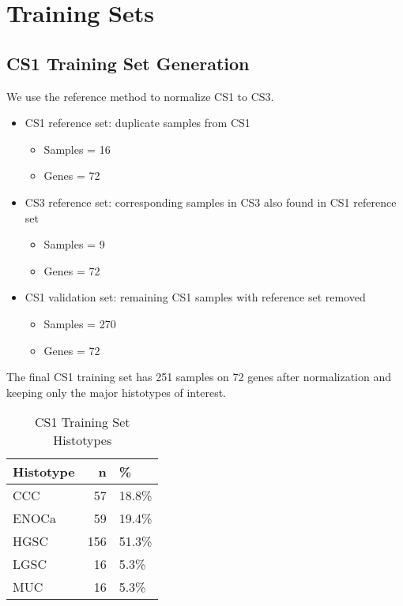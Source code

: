 \documentclass[
]{report}
\providecommand{\tightlist}{%
  \setlength{\itemsep}{0pt}\setlength{\parskip}{0pt}}
\begin{document}
\hypertarget{training-sets}{%
\section{Training Sets}\label{training-sets}}

\hypertarget{cs1-training-set-generation}{%
\subsection{CS1 Training Set Generation}\label{cs1-training-set-generation}}

We use the reference method to normalize CS1 to CS3.

\begin{itemize}
\item
  CS1 reference set: duplicate samples from CS1

  \begin{itemize}
  \tightlist
  \item
    Samples = 16
  \item
    Genes = 72
  \end{itemize}
\item
  CS3 reference set: corresponding samples in CS3 also found in CS1 reference set

  \begin{itemize}
  \tightlist
  \item
    Samples = 9
  \item
    Genes = 72
  \end{itemize}
\item
  CS1 validation set: remaining CS1 samples with reference set removed

  \begin{itemize}
  \tightlist
  \item
    Samples = 270
  \item
    Genes = 72
  \end{itemize}
\end{itemize}

The final CS1 training set has 251 samples on 72 genes after normalization and keeping only the major histotypes of interest.

\begin{table}

\caption{\label{tab:training-dist-cs1}CS1 Training Set Histotypes}
\centering
\begin{tabular}[t]{l|r|l}
\hline
Histotype & n & \%\\
\hline
CCC & 57 & 18.8\%\\
\hline
ENOCa & 59 & 19.4\%\\
\hline
HGSC & 156 & 51.3\%\\
\hline
LGSC & 16 & 5.3\%\\
\hline
MUC & 16 & 5.3\%\\
\hline
\end{tabular}
\end{table}
\end{document}
